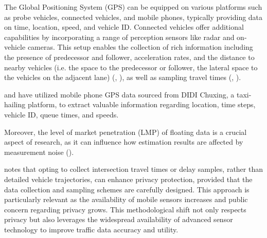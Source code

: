 The Global Positioning System (GPS) can be equipped on various platforms such as probe vehicles, connected vehicles, and mobile phones, typically providing data on time, location, speed, and vehicle ID. Connected vehicles offer additional capabilities by incorporating a range of perception sensors like radar and on-vehicle cameras. This setup enables the collection of rich information including the presence of predecessor and follower, acceleration rates, and the distance to nearby vehicles (i.e. the space to the predecessor or follower, the lateral space to the vehicles on the adjacent lane) (\textcite{comert2021queue}, \textcite{hu2022high}), as well as sampling travel times (\textcite{hao2014cycle}, \textcite{ban2011real}).

\textcite{yin2018kalman} and \textcite{gao2019connected} have utilized mobile phone GPS data sourced from DIDI Chuxing, a taxi-hailing platform, to extract valuable information regarding location, time steps, vehicle ID, queue times, and speeds.

Moreover, the level of market penetration (LMP) of floating data is a crucial aspect of research, as it can influence how estimation results are affected by measurement noise (\textcite{hu2022high}).

\textcite{ban2011real} notes that opting to collect intersection travel times or delay samples, rather than detailed vehicle trajectories, can enhance privacy protection, provided that the data collection and sampling schemes are carefully designed. This approach is particularly relevant as the availability of mobile sensors increases and public concern regarding privacy grows. This methodological shift not only respects privacy but also leverages the widespread availability of advanced sensor technology to improve traffic data accuracy and utility.




